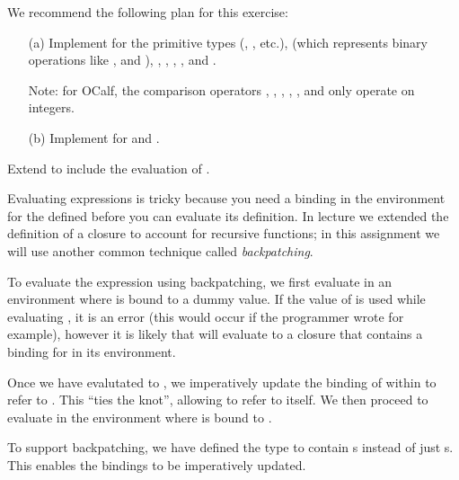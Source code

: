 \documentclass{pset}
\begin{document}

We recommend the following plan for this exercise:

\begin{enumerate}
\item[(a)] Implement  for the primitive types (,
    , etc.),  (which represents binary operations like
    \code{+}, \code{*} and \code{^}), , , ,
    , and .
    
    Note: for OCalf, the comparison operators \code{=}, \code{<}, \code{<=},
    \code{>}, \code{>=}, and \code{<>} only operate on integers.
\item[(b)] Implement  for  and .
\end{enumerate}


Extend  to include the evaluation of .

Evaluating  expressions is tricky because you need a binding in
the environment for the defined before you can evaluate its definition.  In
lecture we extended the definition of a closure to account for recursive
functions; in this assignment we will use another common technique called
\emph{backpatching}.

To evaluate the expression  using backpatching, we
first evaluate  in an environment where  is bound to a dummy
value.  If the value of  is used while evaluating , it is an
error (this would occur if the programmer wrote  for
example), however it is likely that  will evaluate to a closure that
contains a binding for  in its environment.

Once we have evalutated  to , we imperatively update the
binding of  within  to refer to .  This ``ties the
knot'', allowing  to refer to itself.  We then proceed to evaluate
 in the environment where  is bound to .

To support backpatching, we have defined the  type to contain
s instead of just s.  This enables the bindings
to be imperatively updated.

\end{document}
